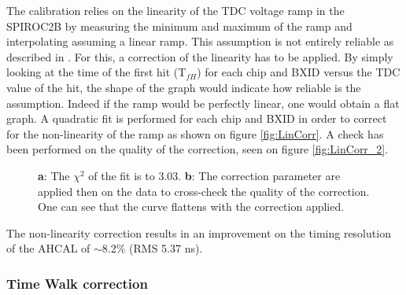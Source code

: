 \documentclass[twoside,a4paper,11pt]{article}
\begin{document}
The calibration relies on the linearity of the TDC voltage ramp in the SPIROC2B by measuring the minimum and maximum of the ramp and interpolating assuming a linear ramp. This assumption is not entirely reliable as described in \cite{OskarSSP, EldwanSSP}. For this, a correction of the linearity has to be applied. By simply looking at the time of the first hit (T$_{fH}$) for each chip and BXID versus the TDC value of the hit, the shape of the graph would indicate how reliable is the assumption. Indeed if the ramp would be perfectly linear, one would obtain a flat graph.
A quadratic fit is performed for each chip and BXID in order to correct for the non-linearity of the ramp as shown on figure \ref{fig:LinCorr}. A check has been performed on the quality of the correction, seen on figure \ref{fig:LinCorr_2}.
\begin{figure}[htbp]
	\hfill
	\caption[]{\textbf{a}: The $\chi^2$ of the fit is to 3.03. \textbf{b}: The correction parameter are applied then on the data to cross-check the quality of the correction. One can see that the curve flattens with the correction applied.}
\end{figure}
The non-linearity correction results in an improvement on the timing resolution of the AHCAL of $\sim$8.2\% (RMS 5.37 ns).

\subsubsection{Time Walk correction}
\label{subsec:timewalk}
\end{document}
